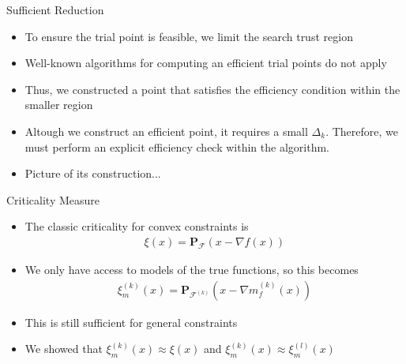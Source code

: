 \documentclass{beamer}
\newcommand{\feasible}{\mathcal F}
\newcommand{\feasiblek}{\mathcal F^{(k)}}
\newcommand{\proj}{\textbf{P}}
\begin{document}
\begin{frame}{Sufficient Reduction}
	\begin{itemize}
		\item To ensure the trial point is feasible, we limit the search trust region
		\item Well-known algorithms for computing an efficient trial points do not apply
		\item Thus, we constructed a point that satisfies the efficiency condition within the smaller region
		\item Altough we construct an efficient point, it requires a small $\Delta_k$.
			Therefore, we must perform an explicit efficiency check within the algorithm.
		\color{red}
		\item Picture of its construction...
		\color{black}
	\end{itemize}
\end{frame}


\begin{frame}{Criticality Measure}
	\begin{itemize}
		\item The classic criticality for convex constraints is
\begin{align*}
\xi(x) = \proj_{\feasible}\left(x - \nabla f(x)\right)
\end{align*}
		\item We only have access to models of the true functions, so this becomes
\begin{align*}
\xi_m^{(k)}(x) = \proj_{\feasiblek}\left(x - \nabla m_f^{(k)}(x)\right)
\end{align*}
		\item This is still sufficient for general constraints
		\item We showed that $\xi_m^{(k)}(x) \approx \xi(x)$ and $\xi_m^{(k)}(x) \approx \xi_m^{(l)}(x)$
	\end{itemize}
\end{frame}


\end{document}
